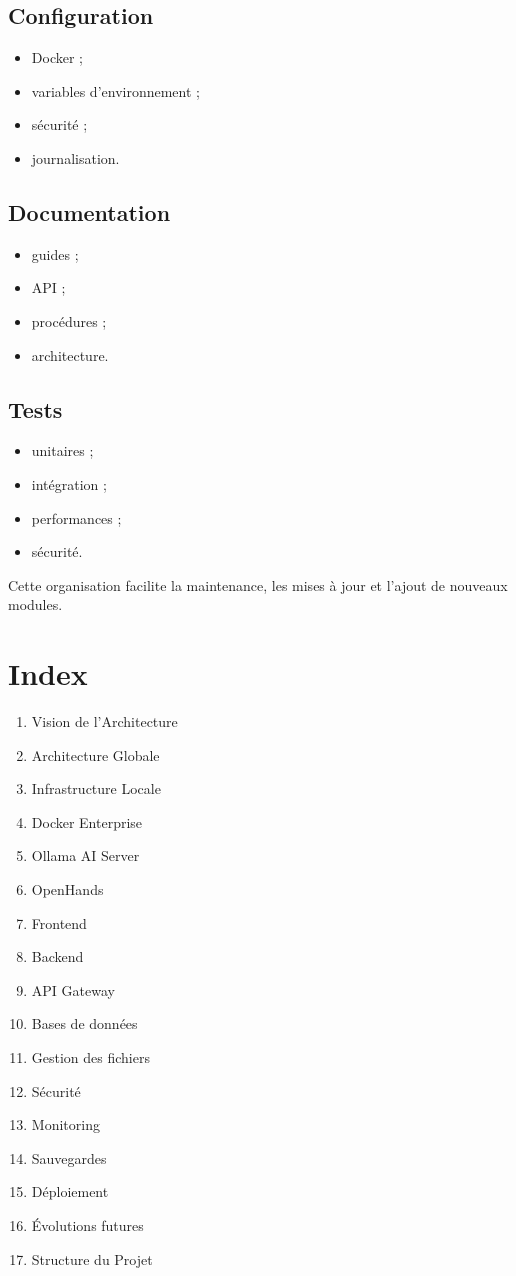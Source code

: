 \documentclass[12pt,a4paper,oneside]{book}
\begin{document}
\section{Configuration}
\begin{itemize}
\item Docker ;
\item variables d'environnement ;
\item sécurité ;
\item journalisation.
\end{itemize}

\section{Documentation}
\begin{itemize}
\item guides ;
\item API ;
\item procédures ;
\item architecture.
\end{itemize}

\section{Tests}
\begin{itemize}
\item unitaires ;
\item intégration ;
\item performances ;
\item sécurité.
\end{itemize}

Cette organisation facilite la maintenance, les mises à jour et l'ajout de nouveaux modules.

\chapter{Index}
\begin{enumerate}
\item Vision de l'Architecture
\item Architecture Globale
\item Infrastructure Locale
\item Docker Enterprise
\item Ollama AI Server
\item OpenHands
\item Frontend
\item Backend
\item API Gateway
\item Bases de données
\item Gestion des fichiers
\item Sécurité
\item Monitoring
\item Sauvegardes
\item Déploiement
\item Évolutions futures
\item Structure du Projet
\end{enumerate}
\end{document}
